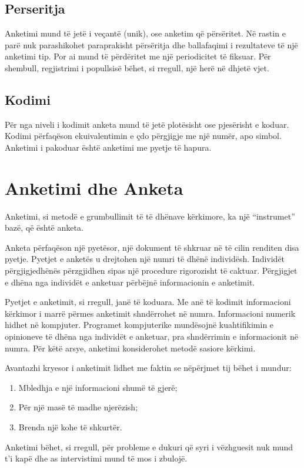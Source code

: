 \documentclass[12pt, a4paper]{article}
\begin{document}
\subsection*{Perseritja}
Anketimi mund të jetë i veçantë (unik), ose anketim që përsëritet. Në rastin e parë nuk parashikohet paraprakisht përsëritja dhe ballafaqimi i rezultateve të një anketimi tip. Por ai mund të përdëritet me një periodicitet të fiksuar. Për shembull, regjistrimi i popullsisë bëhet, si rregull, një herë në dhjetë vjet.

\subsection*{Kodimi}
Për nga niveli i kodimit anketa mund të jetë plotësisht ose pjesërisht e koduar. Kodimi përfaqëson ekuivalentimin e çdo përgjigje me një numër, apo simbol. Anketimi i pakoduar është anketimi me pyetje të hapura.
\section*{Anketimi dhe Anketa}
Anketimi, si metodë e grumbullimit të të dhënave kërkimore, ka një “instrumet” bazë, që është anketa. 


Anketa përfaqëson një pyetësor, një dokument të shkruar në të cilin renditen disa pyetje. Pyetjet e anketës u drejtohen një numri të dhënë individësh. Individët përgjigjedhënës përzgjidhen sipas një procedure rigorozisht të caktuar. Përgjigjet e dhëna nga individët e anketuar përbëjnë informacionin e anketimit. 


Pyetjet e anketimit, si rregull, janë të koduara. Me anë të kodimit informacioni kërkimor i marrë përmes anketimit shndërrohet në numra. Informacioni numerik hidhet në kompjuter. Programet kompjuterike mundësojnë kuahtifikimin e opinioneve të dhëna nga individët e anketuar, pra shndërrimin e informacionit në numra. Për këtë arsye, anketimi konsiderohet metodë sasiore kërkimi.

Avantazhi kryesor i anketimit lidhet me faktin se nëpërjmet tij bëhet i mundur:
\begin{enumerate}
\item Mbledhja e një informacioni shumë të gjerë; 
\item Për një masë të madhe njerëzish; 
\item Brenda një kohe të shkurtër.
\end{enumerate}

Anketimi bëhet, si rregull, për probleme e dukuri që syri i vëzhguesit nuk mund t’i kapë dhe as intervistimi mund të mos i zbulojë.
\end{document}

